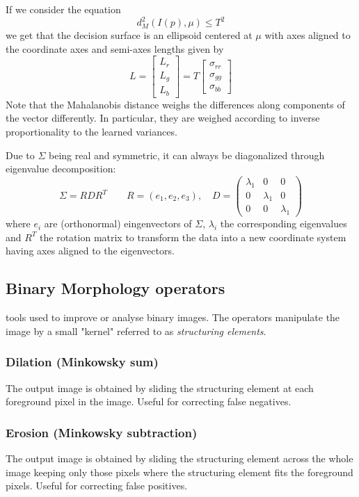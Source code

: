 \documentclass{article}
\begin{document}
If we consider the equation 
\[
    d_M^2(I(p),\mu) \leq T^2
\]
we get that the decision surface is an ellipsoid centered at $\mu$ with axes aligned to the coordinate axes and semi-axes lengths given by
\[
    L=\begin{bmatrix}
        L_r \\ L_g \\ L_b
    \end{bmatrix} = T \begin{bmatrix}
        \sigma_{rr} \\\sigma_{gg} \\\sigma_{bb} 
    \end{bmatrix}
\]
Note that the Mahalanobis distance weighs the differences along components of the vector differently. In particular, they are weighed according to inverse proportionality to the learned variances.

Due to $\Sigma$ being real and symmetric, it can always be diagonalized through eigenvalue decomposition:
\[
    \Sigma = RDR^T \qquad R=(e_1,e_2,e_3), \quad D= \begin{pmatrix}
        \lambda_1 & 0 & 0\\
        0 & \lambda_1 & 0\\
        0 & 0 & \lambda_1
    \end{pmatrix}
\]
where $e_i$ are (orthonormal) eingenvectors of $\Sigma$, $\lambda_i$ the corresponding eigenvalues and $R^T$ the rotation matrix to transform the data into a new coordinate system having axes aligned to the eigenvectors. 
\subsection{Binary Morphology operators}
tools used to improve or analyse binary images. The operators manipulate the image by a small "kernel" referred to as \emph{structuring elements}.
\subsubsection{Dilation (Minkowsky sum)}
The output image is obtained by sliding the structuring element at each foreground pixel in the image. Useful for correcting false negatives.
\subsubsection{Erosion (Minkowsky subtraction)}
The output image is obtained by sliding the structuring element across the whole image keeping only those pixels where the structuring element fits the foreground pixels. Useful for correcting false positives.
\end{document}
